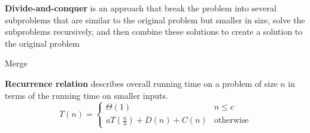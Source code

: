 \documentclass[11pt]{article}
\begin{document}
\begin{defn*}
  \textbf{Divide-and-conquer} is an approach that break the problem into several subproblems that are similar to the original problem but smaller in size, solve the subproblems recursively, and then combine these solutions to create a solution to the original problem
\end{defn*}

\begin{algorithm}[H]
  \DontPrintSemicolon


  \caption{\sc Merge}
\end{algorithm}


\begin{algorithm}[H]
  \DontPrintSemicolon

\end{algorithm}


\begin{defn*}
  \textbf{Recurrence relation} describes overall running time on a problem of size $n$ in terms of the running time on smaller inputs.
  \[
    T(n) =
    \begin{cases}
      \Theta(1) & n\leq c\\
      aT(\frac{n}{b}) + D(n) + C(n) & \text{otherwise}  \tag{$D$ - divide; $C$ - combine}
    \end{cases}
  \]
\end{defn*}
\end{document}
